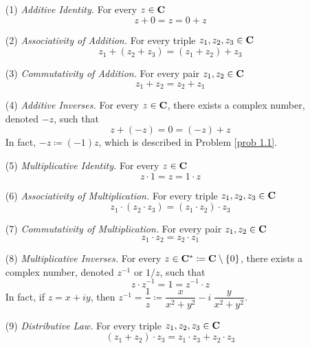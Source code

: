 \begin{proposition}\label{cafield}
\hfill
\begin{itemize}
\item[(1)] \emph{Additive Identity.} For every $z \in \mathbf C$
\[z + 0 = z = 0 + z\]
\item[(2)] \emph{Associativity of Addition.} For every triple $z_1,z_2,z_3 \in \mathbf C$
\[z_1 + (z_2 + z_3) = (z_1 + z_2) + z_3\]
\item[(3)] \emph{Commutativity of Addition.} For every pair $z_1,z_2 \in \mathbf C$
\[z_1 + z_2 = z_2 + z_1\]
\item[(4)] \emph{Additive Inverses.} For every $z \in \mathbf C$, there exists a complex number, denoted $-z$, such that
\[z + (-z) = 0 = (-z) + z\]
In fact, $-z \coloneqq (-1)z$, which is described in Problem \ref{prob 1.1}.
\item[(5)] \emph{Multiplicative Identity.} For every $z \in \mathbf C$
\[z \cdot 1 = z = 1 \cdot z\]
\item[(6)] \emph{Associativity of Multiplication.} For every triple $z_1,z_2,z_3 \in \mathbf C$
\[z_1 \cdot (z_2 \cdot z_3) = (z_1 \cdot z_2) \cdot z_3\]
\item[(7)] \emph{Commutativity of Multiplication.} For every pair $z_1,z_2 \in \mathbf C$
\[z_1\cdot z_2 = z_2\cdot z_1\]
\item[(8)] \emph{Multiplicative Inverses.} For every $z \in \mathbf C^* \coloneqq \mathbf C\setminus\left\{0\right\}$, there exists a complex number, denoted $z^{-1}$ or $1/z$, such that
\[z \cdot z^{-1} = 1 = z^{-1} \cdot z\]
In fact, if $z =  x + iy$, then $z^{-1} = \dfrac{1}{z} \coloneqq \dfrac{x}{x^2 + y^2} - i\ \dfrac{y}{x^2 + y^2}$.
\item[(9)] \emph{Distributive Law.} For every triple $z_1,z_2,z_3 \in \mathbf C$
\[(z_1 + z_2)\cdot z_3 = z_1\cdot z_3 + z_2\cdot z_3\]
\end{itemize}
\end{proposition}
